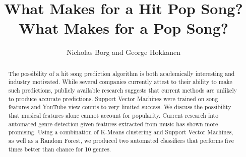 \documentclass[12pt]{amsart}
\title{What Makes for a Hit Pop Song? What Makes for a Pop Song?}
\author{Nicholas Borg and George Hokkanen}
\begin{document}
\maketitle

\begin{abstract}
The possibility of a hit song prediction algorithm is both academically interesting and industry motivated. While several companies currently attest to their ability to make such predictions, publicly available research suggests that current methods are unlikely to produce accurate predictions. Support Vector Machines were trained on song features and YouTube view counts to very limited success. We discuss the possibility that musical features alone cannot account for popularity. Current research into automated genre detection given features extracted from music has shown more promising. Using a combination of K-Means clustering and Support Vector Machines, as well as a Random Forest, we produced two automated classifiers that performs five times better than chance for 10 genres. 
\end{abstract}
\end{document}
